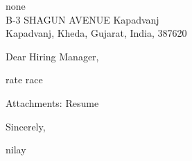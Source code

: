 \documentclass[11pt,a4paper]{letter}
\begin{document}
\begin{letter}{
none\\
B-3 SHAGUN AVENUE Kapadvanj\\
Kapadvanj, Kheda, Gujarat, India, 387620
}

\address{
nilay\\
B-3 SHAGUN AVENUE Kapadvanj\\
Kapadvanj, Kheda, Gujarat, India, 387620\\
9016989674\\
\href{mailto:nilaypatel@gmail.com}{nilaypatel@gmail.com}
}

\date{12/11/2024}

\opening{Dear Hiring Manager,}

rate race

\vspace{\baselineskip}
\noindent Attachments: Resume

\closing{Sincerely,}nilay

\end{letter}
\end{document}
